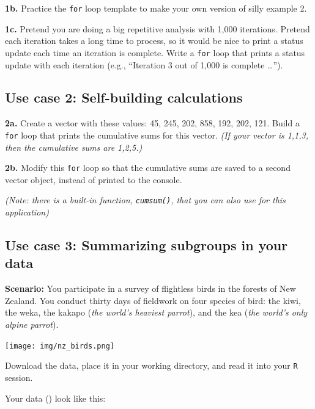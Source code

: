 \documentclass[
]{book}
\begin{document}
\textbf{1b.} Practice the \texttt{for} loop template to make your own version of silly example 2.

\textbf{1c.} Pretend you are doing a big repetitive analysis with 1,000 iterations. Pretend each iteration takes a long time to process, so it would be nice to print a status update each time an iteration is complete. Write a \texttt{for} loop that prints a status update with each iteration (e.g., ``Iteration 3 out of 1,000 is complete \ldots{}'').

\hypertarget{use-case-2-self-building-calculations}{%
\subsection*{Use case 2: Self-building calculations}\label{use-case-2-self-building-calculations}}

\textbf{2a.} Create a vector with these values: 45, 245, 202, 858, 192, 202, 121. Build a \texttt{for} loop that prints the cumulative sums for this vector. \emph{(If your vector is 1,1,3, then the cumulative sums are 1,2,5.)}

\textbf{2b.} Modify this \texttt{for} loop so that the cumulative sums are saved to a second vector object, instead of printed to the console.

\emph{(Note: there is a built-in function, \texttt{cumsum()}, that you can also use for this application)}

\hypertarget{use-case-3-summarizing-subgroups-in-your-data}{%
\subsection*{Use case 3: Summarizing subgroups in your data}\label{use-case-3-summarizing-subgroups-in-your-data}}

\textbf{Scenario:} You participate in a survey of flightless birds in the forests of New Zealand. You conduct thirty days of fieldwork on four species of bird: the kiwi, the weka, the kakapo (\emph{the world's heaviest parrot}), and the kea (\emph{the world's only alpine parrot}).

\texttt{[image: img/nz\_birds.png]}

Download the data, place it in your working directory, and read it into your \texttt{R} session.

Your data () look like this:
\end{document}
